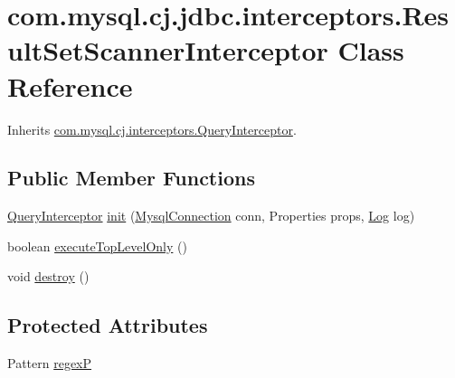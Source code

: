 \hypertarget{classcom_1_1mysql_1_1cj_1_1jdbc_1_1interceptors_1_1_result_set_scanner_interceptor}{}\section{com.\+mysql.\+cj.\+jdbc.\+interceptors.\+Result\+Set\+Scanner\+Interceptor Class Reference}
\label{classcom_1_1mysql_1_1cj_1_1jdbc_1_1interceptors_1_1_result_set_scanner_interceptor}


Inherits \mbox{\hyperlink{interfacecom_1_1mysql_1_1cj_1_1interceptors_1_1_query_interceptor}{com.\+mysql.\+cj.\+interceptors.\+Query\+Interceptor}}.

\subsection*{Public Member Functions}
\begin{DoxyCompactItemize}
\item 
\mbox{\hyperlink{interfacecom_1_1mysql_1_1cj_1_1interceptors_1_1_query_interceptor}{Query\+Interceptor}} \mbox{\hyperlink{classcom_1_1mysql_1_1cj_1_1jdbc_1_1interceptors_1_1_result_set_scanner_interceptor_a8b4dccb5d9c1fd75ed0e04fe50a2c087}{init}} (\mbox{\hyperlink{interfacecom_1_1mysql_1_1cj_1_1_mysql_connection}{Mysql\+Connection}} conn, Properties props, \mbox{\hyperlink{interfacecom_1_1mysql_1_1cj_1_1log_1_1_log}{Log}} log)
\item 
boolean \mbox{\hyperlink{classcom_1_1mysql_1_1cj_1_1jdbc_1_1interceptors_1_1_result_set_scanner_interceptor_a3f3a48cedb6de0c16b6ea146aaff4af0}{execute\+Top\+Level\+Only}} ()
\item 
void \mbox{\hyperlink{classcom_1_1mysql_1_1cj_1_1jdbc_1_1interceptors_1_1_result_set_scanner_interceptor_a6e0fa82b6d4827d34c1db0676419efa5}{destroy}} ()
\end{DoxyCompactItemize}
\subsection*{Protected Attributes}
\begin{DoxyCompactItemize}
\item 
Pattern \mbox{\hyperlink{classcom_1_1mysql_1_1cj_1_1jdbc_1_1interceptors_1_1_result_set_scanner_interceptor_a1546575c417e1be4a380a9154c1aa05a}{regexP}}
\end{DoxyCompactItemize}


